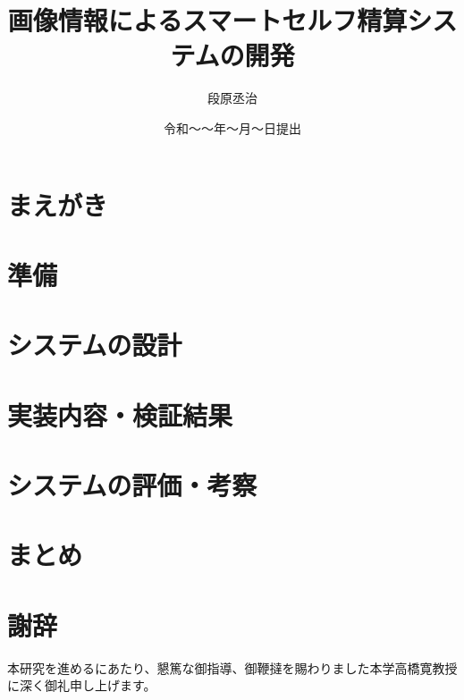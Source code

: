 

\newenvironment{indention}[1]{\par
\addtolength{\leftskip}{#1}
\begingroup}{\endgroup\par}

\title{画像情報によるスマートセルフ精算システムの開発}
\author{段原丞治}
\date{令和～～年～月～日提出}


\maketitle
\tableofcontents
\cleardoublepage
{}

\chapter{まえがき}


\chapter{準備}


\chapter{システムの設計}






\chapter{実装内容・検証結果}



\chapter{システムの評価・考察}


\chapter{まとめ}



\newpage
{}
\chapter*{謝辞}
本研究を進めるにあたり、懇篤な御指導、御鞭撻を賜わりました本学高橋寛教授に深く御礼申し上げます。

